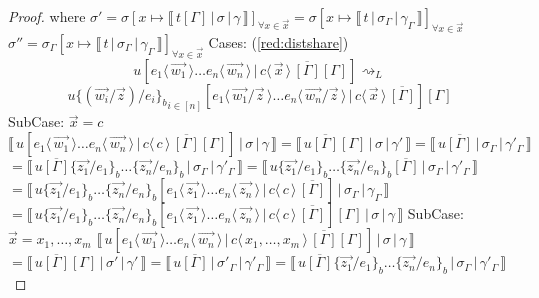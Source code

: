 \documentclass[a4paper,UKenglish,cleveref, autoref]{lipics-v2019}
\newcommand{\dist}[5]{#1 [ #2 \, \vert \, \fakedist{#4}{#5} \, #3 ]}
\newcommand{\fakedist}[2]{#1 \langle \, #2 \, \rangle}
\newcommand{\psub}[3]{#1 \{ #2 / #3 \}_{b}}
\newcommand{\readbackwmap}[3]{\llbracket \, #1 \, \vert \, #2 \, \vert \, #3  \, \rrbracket }
\begin{document}
\begin{proof}
\newline
where
\newline
$\sigma' = \sigma [x \mapsto \readbackwmap{t [\Gamma]}{\sigma}{\gamma}]_{\forall x \in \vec{x}} = \sigma[x \mapsto \readbackwmap{t}{\sigma_{\Gamma}}{\gamma_{\Gamma}}]_{\forall x \in \vec{x}}$
\newline
$\sigma'' =  \sigma_{\Gamma} [x \mapsto \readbackwmap{t}{\sigma_{\Gamma}}{\gamma_{\Gamma}}]_{\forall x \in \vec{x}}$
\newline
\newline
Cases: (\ref{red:distshare})
$$\dist{u}{\fakedist{e_{1}}{\vec{w_{1}}} \dots \fakedist{e_{n}}{\vec{w_{n}}}}{\overline{[\Gamma]} [\Gamma]}{c}{\vec{x}}  \rightsquigarrow_{L}$$ $$\dist{u {\psub{}{(\vec{w_{i}} / \vec{z})}{e_{i}}}_{i \in [n]}}{\fakedist{e_{1}}{\vec{w_{1}} / \vec{z}} \dots \fakedist{e_{n}}{\vec{w_{n}} / \vec{z}}}{\overline{[\Gamma]}}{c}{\vec{x}}[\Gamma] $$
\indent SubCase: $\vec{x} = c$
\newline
$\readbackwmap{\dist{u}{\fakedist{e_{1}}{\vec{w_{1}}} \dots \fakedist{e_{n}}{\vec{w_{n}}}}{\overline{[\Gamma]} [\Gamma]}{c}{c}}{\sigma}{\gamma} = \readbackwmap{u \overline{[\Gamma]} [\Gamma]}{\sigma}{\gamma'} = \readbackwmap{u \overline{[\Gamma]}}{\sigma_{\Gamma}}{\gamma'_{\Gamma}}$
\newline
$= \readbackwmap{u \overline{[\Gamma]} \psub{}{\vec{z_{1}}}{e_{1}} \dots \psub{}{\vec{z_{n}}}{e_{n}} }{\sigma_{\Gamma}}{\gamma'_{\Gamma}} =  \readbackwmap{u \psub{}{\vec{z_{1}}}{e_{1}} \dots \psub{}{\vec{z_{n}}}{e_{n}} \overline{[\Gamma]}}{\sigma_{\Gamma}}{\gamma'_{\Gamma}}$
\newline
$= \readbackwmap{ \dist{u \psub{}{\vec{z_{1}}}{e_{1}} \dots \psub{}{\vec{z_{n}}}{e_{n}} }{\fakedist{e_{1}}{\vec{z_{1}}} \dots \fakedist{e_{n}}{\vec{z_{n}}}}{\overline{[\Gamma]}}{c}{c}}{\sigma_{\Gamma}}{\gamma_{\Gamma}}$
\newline
$= \readbackwmap{ \dist{u \psub{}{\vec{z_{1}}}{e_{1}} \dots \psub{}{\vec{z_{n}}}{e_{n}} }{\fakedist{e_{1}}{\vec{z_{1}}} \dots \fakedist{e_{n}}{\vec{z_{n}}}}{\overline{[\Gamma]}}{c}{c} [\Gamma]}{\sigma}{\gamma}$
\newline
\newline
\indent SubCase: $\vec{x} = x_{1}, \dots, x_{m}$
\newline
$\readbackwmap{\dist{u}{\fakedist{e_{1}}{\vec{w_{1}}} \dots \fakedist{e_{n}}{\vec{w_{n}}}}{\overline{[\Gamma]} [\Gamma]}{c}{x_{1}, \dots, x_{m}}}{\sigma}{\gamma} $
\newline
$= \readbackwmap{u \overline{[\Gamma]} [\Gamma]}{\sigma'}{\gamma'} = \readbackwmap{u \overline{[\Gamma]}}{\sigma'_{\Gamma}}{\gamma'_{\Gamma}} = \readbackwmap{u \overline{[\Gamma]} \psub{}{\vec{z_{1}}}{e_{1}} \dots \psub{}{\vec{z_{n}}}{e_{n}} }{\sigma_{\Gamma}}{\gamma'_{\Gamma}}$

\end{proof}
\end{document}
